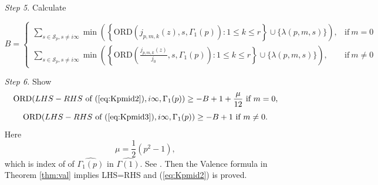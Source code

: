 \documentclass[12pt]{amsart}
\theoremstyle{definition}
\theoremstyle{remark}
\numberwithin{equation}{section}
\newcommand\ORD{\mbox{ORD}}
\newcommand\thm[1]{\ref{thm:#1}}
\newcommand\eqn[1]{(\ref{eq:#1})}
\begin{document}
\begin{enumerate}
using Theorem \thm{ordlb}. We note that value is an integer.

\item[\textit{Step 5.}] Calculate 

 \begin{equation}
\label{eq:BLB1}
    B=
    \begin{cases}
     \sum\limits_{s \in \mathcal{S}_p,s \neq i\infty} \min\left(\left\{\ORD\left(j_{p,m,k}(z),s,\Gamma_1(p)\right):1 \leq k \leq r\right\}\cup \{\lambda(p,m,s)\}\right), & \text{if}\ m=0 
\\
      \sum\limits_{s \in \mathcal{S}_p,s \neq i\infty} \min\left(\left\{\ORD\left(\frac{j_{p,m,k}(z)}{j_0},s,\Gamma_1(p)\right):1 \leq k \leq r\right\}\cup \{\lambda(p,m,s)\}\right), & \text{if}\ m\neq 0
    \end{cases}
  \end{equation}


\item[\textit{Step 6.}] Show 
$$
\ORD(LHS-RHS~\text{of}~\eqn{Kpmid2},i \infty,\Gamma_1(p))\ge -B+1+\frac{\mu}{12}~\text{if}~m=0,
$$ 
$$
\ORD(LHS-RHS~\text{of}~\eqn{Kpmid3},i \infty,\Gamma_1(p))\ge -B+1~\text{if}~m\neq0.
$$
Here 
\begin{equation}
\label{eq:mupeq}
\mu = \frac{1}{2}(p^2-1),
\end{equation}
which is  index of  
of  $\widehat{\Gamma_1(p)}$ in $\widehat{\Gamma(1)}$. 
See \cite[Thm.4.2.5, p.106]{Miyake}.
Then the Valence formula in Theorem \thm{val} implies LHS=RHS and \eqn{Kpmid2} is proved.
\end{enumerate}
\end{document}
